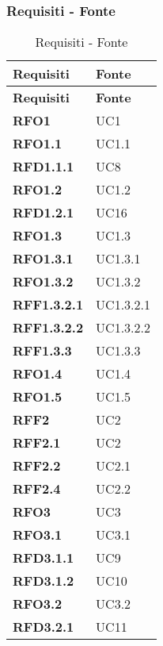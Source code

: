 \subsubsection{Requisiti - Fonte}
\label{sssec:requisiti_fonte}

\renewcommand{\arraystretch}{2} %
\begin{longtable}[H]{>{\centering\bfseries}m{8cm} >{\centering\arraybackslash}m{8cm}}
  \caption{Requisiti - Fonte}%
  \label{tab:requisiti_fonte}                                                    \\
  \rowcolor{lightgray}
  {\textbf{Requisiti}} & {\textbf{Fonte}}  \\
  \endfirsthead%
  \rowcolor{lightgray}
  {\textbf{Requisiti}} & {\textbf{Fonte}}  \\
  \endhead%
  \rowcolor{white}
  \multicolumn{2}{c}{\textit{Continua alla pagina successiva}}
  \endfoot%
  \endlastfoot%
  \textbf{RFO1} & UC1 \\
  \textbf{RFO1.1} & UC1.1 \\
  \textbf{RFD1.1.1} & UC8 \\
  \textbf{RFO1.2} & UC1.2 \\
  \textbf{RFD1.2.1} & UC16 \\
  \textbf{RFO1.3} & UC1.3 \\
  \textbf{RFO1.3.1} & UC1.3.1 \\
  \textbf{RFO1.3.2} & UC1.3.2 \\
  \textbf{RFF1.3.2.1} & UC1.3.2.1 \\
  \textbf{RFF1.3.2.2} & UC1.3.2.2 \\
  \textbf{RFF1.3.3} & UC1.3.3 \\
  \textbf{RFO1.4} & UC1.4 \\
  \textbf{RFO1.5} & UC1.5 \\
  \textbf{RFF2} & UC2 \\
  \textbf{RFF2.1} & UC2 \\
  \textbf{RFF2.2} & UC2.1 \\
  \textbf{RFF2.4} & UC2.2 \\
  \textbf{RFO3} & UC3 \\
  \textbf{RFO3.1} & UC3.1 \\
  \textbf{RFD3.1.1} & UC9 \\
  \textbf{RFD3.1.2} & UC10 \\
  \textbf{RFO3.2} & UC3.2 \\
  \textbf{RFD3.2.1} & UC11 \\

\end{longtable}

